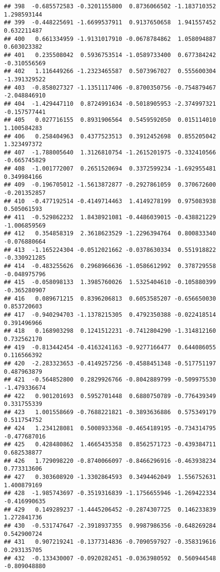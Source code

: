 \documentclass[
]{article}
\begin{document}
\begin{verbatim}
## 398  -0.685572583 -0.3201155800  0.8736066502 -1.183710352  1.298593144
## 399  -0.448225691 -1.6699537911  0.9137650658  1.941557452  0.632211487
## 400   0.661334959 -1.9131017910 -0.0678784862  1.058094887  0.603023382
## 401   0.235508042  0.5936753514 -1.0589733400  0.677384242 -0.310556569
## 402   1.116449266 -1.2323465587  0.5073967027  0.555600304 -1.391329522
## 403  -0.858027327 -1.1351117406 -0.8700350756 -0.754879467 -2.048846910
## 404  -1.429447110  0.8724991634 -0.5018905953 -2.374997321 -0.157577441
## 405   0.027716155  0.8931906564  0.5459592050  0.015114010  1.100584283
## 406   0.258404963  0.4377523513  0.3912452698  0.855205042  1.323497372
## 407  -1.788005640  1.3126810754 -1.2615201975 -0.332410566 -0.665745829
## 408  -1.001772007  0.2651520694  0.3372599234 -1.692955481  0.349984166
## 409  -0.196705012 -1.5613872877 -0.2927861059  0.370672600 -0.201352857
## 410  -0.477192514 -0.4149714463  1.4149278199  0.975083938  0.505061593
## 411  -0.529862232  1.8438921081 -0.4486039015 -0.438821229 -1.006859569
## 412   0.354858319  2.3618623529 -1.2296394764  0.800833340 -0.076880664
## 413  -1.165224304 -0.0512021662 -0.0378630334  0.551918822 -0.330921285
## 414  -0.483255626  0.2968966636 -1.0586612992  0.378729558 -0.048975796
## 415  -0.058098133  1.3985760026  1.5325404610 -0.105880399 -0.365280907
## 416   0.089671215  0.8396206813  0.6053585207 -0.656650030  0.853720603
## 417  -0.940294703 -1.1378215305  0.4792350388 -0.022418514  0.391496966
## 418   0.168903298  0.1241512231 -0.7412804290 -1.314812160  0.732562170
## 419  -0.813442454 -0.4163241163 -0.9277166477  0.644086055  0.116566392
## 420  -2.283323653 -0.4149257256 -0.4588451348 -0.517751197  0.487963879
## 421  -0.564852800  0.2829926766 -0.8042889799 -0.509975530 -1.479336674
## 422   0.901201693  0.5952701448  0.6880750789 -0.776439349  0.331755339
## 423   1.001558669 -0.7688221821 -0.3893636886  0.575349179  0.511754752
## 424   1.234128081  0.5008933368 -0.4654189195 -0.734314795 -0.477687016
## 425   0.428480862  1.4665435358  0.8562571723 -0.439384711  0.682538877
## 426   1.729098220 -0.8740066097 -0.8466296916 -0.463938234  0.773313606
## 427   0.303608920 -1.3302864593  0.3494462049  1.556752631  1.400879169
## 428  -1.985743697 -0.3519316839 -1.1756655946 -1.269422334 -0.416990635
## 429   0.149289237 -1.4445206452 -0.2874307725  0.146233839  1.272841736
## 430  -0.531747647 -2.3918937355  0.9987986356 -0.648269284  0.542900724
## 431   0.907219241 -0.1377314836 -0.7090597927 -0.358319616  0.293135705
## 432  -0.133430007 -0.0920282451 -0.0363980592  0.560944548 -0.809048880

\end{verbatim}
\end{document}

